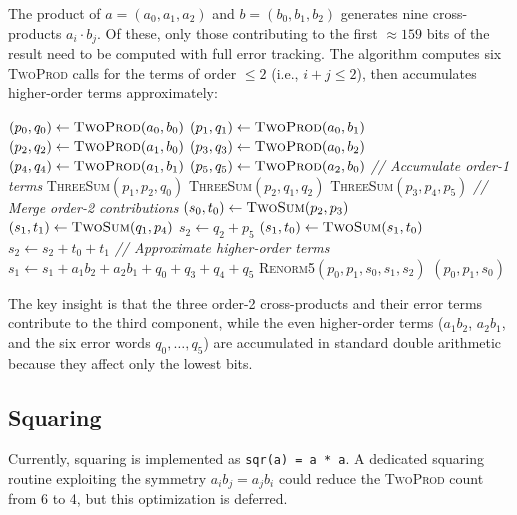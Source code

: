 \documentclass[11pt,a4paper]{article}
\begin{document}
The product of $a = (a_0, a_1, a_2)$ and $b = (b_0, b_1, b_2)$
generates nine cross-products $a_i \cdot b_j$.  Of these, only those
contributing to the first $\approx 159$ bits of the result need to be
computed with full error tracking.  The algorithm computes six
\textsc{TwoProd} calls for the terms of order $\le 2$ (i.e.,
$i + j \le 2$), then accumulates higher-order terms approximately:
\begin{algorithmic}[1]
\State $(p_0, q_0) \gets \textsc{TwoProd}(a_0, b_0)$ 
\State $(p_1, q_1) \gets \textsc{TwoProd}(a_0, b_1)$ 
\State $(p_2, q_2) \gets \textsc{TwoProd}(a_1, b_0)$ 
\State $(p_3, q_3) \gets \textsc{TwoProd}(a_0, b_2)$ 
\State $(p_4, q_4) \gets \textsc{TwoProd}(a_1, b_1)$ 
\State $(p_5, q_5) \gets \textsc{TwoProd}(a_2, b_0)$ 
\State \textit{// Accumulate order-1 terms}
\State \textsc{ThreeSum}$(p_1, p_2, q_0)$
\State \textsc{ThreeSum}$(p_2, q_1, q_2)$
\State \textsc{ThreeSum}$(p_3, p_4, p_5)$
\State \textit{// Merge order-2 contributions}
\State $(s_0, t_0) \gets \textsc{TwoSum}(p_2, p_3)$
\State $(s_1, t_1) \gets \textsc{TwoSum}(q_1, p_4)$
\State $s_2 \gets q_2 + p_5$
\State $(s_1, t_0) \gets \textsc{TwoSum}(s_1, t_0)$
\State $s_2 \gets s_2 + t_0 + t_1$
\State \textit{// Approximate higher-order terms}
\State $s_1 \gets s_1 + a_1 b_2 + a_2 b_1 + q_0 + q_3 + q_4 + q_5$
\State \textsc{Renorm5}$(p_0, p_1, s_0, s_1, s_2)$
\State \Return $(p_0, p_1, s_0)$
\end{algorithmic}
The key insight is that the three order-2 cross-products and their
error terms contribute to the third component, while the even
higher-order terms ($a_1 b_2$, $a_2 b_1$, and the six error words
$q_0, \ldots, q_5$) are accumulated in standard double arithmetic
because they affect only the lowest bits.

\subsection{Squaring}

Currently, squaring is implemented as \texttt{sqr(a) = a * a}.
A dedicated squaring routine exploiting the symmetry
$a_i b_j = a_j b_i$ could reduce the \textsc{TwoProd} count
from 6 to 4, but this optimization is deferred.
\end{document}

